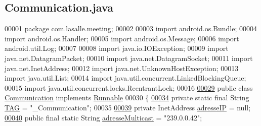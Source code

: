 \hypertarget{_communication_8java_source}{}\subsection{Communication.\+java}
\label{_communication_8java_source}

\begin{DoxyCode}
00001 \textcolor{keyword}{package }com.lasalle.meeting;
00002 
00003 \textcolor{keyword}{import} android.os.Bundle;
00004 \textcolor{keyword}{import} android.os.Handler;
00005 \textcolor{keyword}{import} android.os.Message;
00006 \textcolor{keyword}{import} android.util.Log;
00007 
00008 \textcolor{keyword}{import} java.io.IOException;
00009 \textcolor{keyword}{import} java.net.DatagramPacket;
00010 \textcolor{keyword}{import} java.net.DatagramSocket;
00011 \textcolor{keyword}{import} java.net.InetAddress;
00012 \textcolor{keyword}{import} java.net.UnknownHostException;
00013 \textcolor{keyword}{import} java.util.List;
00014 \textcolor{keyword}{import} java.util.concurrent.LinkedBlockingQueue;
00015 \textcolor{keyword}{import} java.util.concurrent.locks.ReentrantLock;
00016 
\hyperlink{classcom_1_1lasalle_1_1meeting_1_1_communication}{00029} \textcolor{keyword}{public} \textcolor{keyword}{class }\hyperlink{classcom_1_1lasalle_1_1meeting_1_1_communication}{Communication} \textcolor{keyword}{implements} \hyperlink{class_runnable}{Runnable}
00030 \{
\hyperlink{classcom_1_1lasalle_1_1meeting_1_1_communication_a5d58f88df1f20b4d61edbed9a82eccab}{00034}     \textcolor{keyword}{private} \textcolor{keyword}{static} \textcolor{keyword}{final} String \hyperlink{classcom_1_1lasalle_1_1meeting_1_1_communication_a5d58f88df1f20b4d61edbed9a82eccab}{TAG} = \textcolor{stringliteral}{"\_Communication"};
00035 
\hyperlink{classcom_1_1lasalle_1_1meeting_1_1_communication_a46e5fbc8ec97ad651d544e09121a6468}{00039}     \textcolor{keyword}{private} InetAddress \hyperlink{classcom_1_1lasalle_1_1meeting_1_1_communication_a46e5fbc8ec97ad651d544e09121a6468}{adresseIP} = null;
\hyperlink{classcom_1_1lasalle_1_1meeting_1_1_communication_a6a2d2e62f87bef261a1999eb5acf8abb}{00040}     \textcolor{keyword}{public} \textcolor{keyword}{final} \textcolor{keyword}{static} String \hyperlink{classcom_1_1lasalle_1_1meeting_1_1_communication_a6a2d2e62f87bef261a1999eb5acf8abb}{adresseMulticast} = \textcolor{stringliteral}{"239.0.0.42"};    

\end{DoxyCode}
